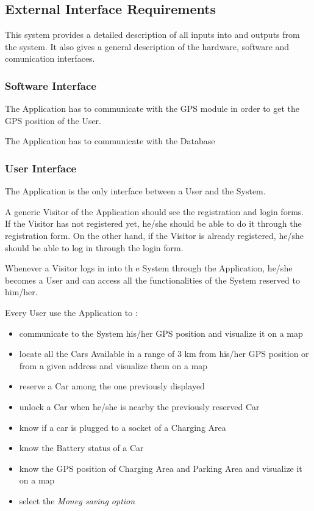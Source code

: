 \subsection{External Interface Requirements}
This system provides a detailed description of all inputs into and outputs from the system. It also gives a general description of the hardware, software and comunication interfaces.

\subsubsection{Software Interface}
The Application has to communicate with the GPS module in order to get the GPS position of the User.

The Application has to communicate with the Database 

\subsubsection{User Interface}
The Application is the only interface between a User and the System.

A generic Visitor of the Application should see the registration and login forms. If the Visitor has not registered yet, he/she should be able to do it through the registration form.
On the other hand, if the Visitor is already registered, he/she should be able to log in through the login form.

Whenever a Visitor logs in into th e System through the Application, he/she becomes a User and can access all the functionalities of the System reserved to him/her.

Every User use the Application to :
\begin{itemize}
	\item communicate to the System his/her GPS position and visualize it on a map
	\item locate all the Cars Available in a range of 3 km from his/her GPS position or from a given address and visualize them on a map
	\item reserve a Car among the one previously displayed
	\item unlock a Car when he/she is nearby the previously reserved Car
	\item know if a car is plugged to a socket of a Charging Area
	\item know the Battery status of a Car
	\item know the GPS position of Charging Area and Parking Area and visualize it on a map	
	\item select the \textit{Money saving option}
\end{itemize}

